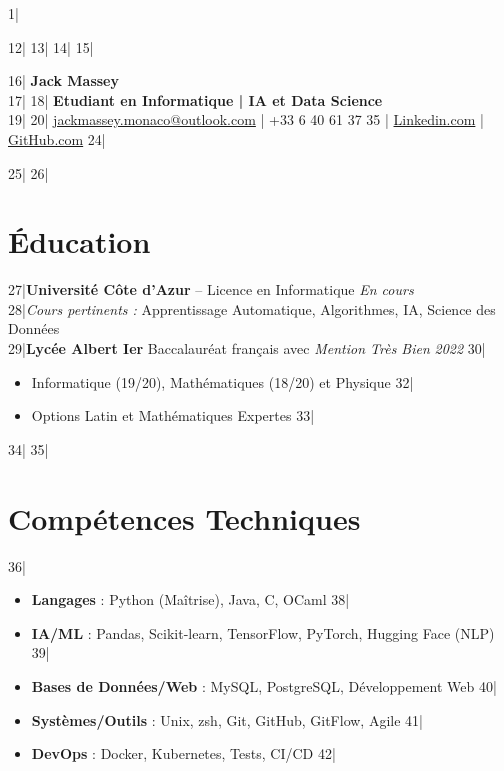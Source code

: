 1|\documentclass[a4paper,10pt]{article}
\begin{document}
12|
13|\pagestyle{empty}
14|
15|\begin{center}
16|    {\Huge \textbf{Jack Massey}}\\
17|    \vspace{2pt}
18|    \textbf{Etudiant en Informatique | IA et Data Science}\\
19|    \vspace{5pt}
20|    \faEnvelope \hspace{2pt} \href{mailto:jackmassey.monaco@outlook.com}{jackmassey.monaco@outlook.com} |    \faPhone \hspace{2pt} +33 6 40 61 37 35 |    \faLinkedin \hspace{2pt} \href{https://www.linkedin.com/in/masseyjack/}{Linkedin.com} |    \faGithub \hspace{2pt} \href{https://github.com/TerminalGambit/}{GitHub.com}
24|\end{center}
25|
26|\section*{Éducation}
27|\textbf{Université Côte d'Azur} -- Licence en Informatique \hfill \textit{En cours}\\
28|\textit{Cours pertinents :} Apprentissage Automatique, Algorithmes, IA, Science des Données\\
29|\textbf{Lycée Albert Ier} Baccalauréat français avec \textit{Mention Très Bien} \hfill \textit{2022}
30|\begin{itemize}
31|	\item Informatique (19/20), Mathématiques (18/20) et Physique
32|	\item Options Latin et Mathématiques Expertes
33|\end{itemize}
34|
35|\section*{Compétences Techniques}
36|\begin{itemize}
37|    \item \textbf{Langages} : Python (Maîtrise), Java, C, OCaml
38|    \item \textbf{IA/ML} : Pandas, Scikit-learn, TensorFlow, PyTorch, Hugging Face (NLP)
39|    \item \textbf{Bases de Données/Web} : MySQL, PostgreSQL, Développement Web
40|    \item \textbf{Systèmes/Outils} : Unix, zsh, Git, GitHub, GitFlow, Agile
41|    \item \textbf{DevOps} : Docker, Kubernetes, Tests, CI/CD
42|\end{itemize}
\end{document}
